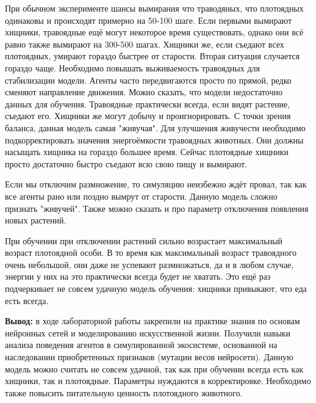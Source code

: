 \documentclass[a4paper,14pt]{extarticle}
\begin{document}
При обычном эксперименте шансы вымирания что траводяных, что плотоядных одинаковы и происходят примерно на 50-100 шаге. Если 
первыми вымирают хищники, травоядные ещё могут некоторое время существовать, однако они всё равно также вымирают на 300-500 шагах. 
Хищники же, если съедают всех плотоядных, умирают гораздо быстрее от старости. Вторая ситуация случается гораздо чаще. Необходимо 
повышать выживаемость травоядных для стабилизации модели. Агенты часто передвигаются просто по прямой, редко сменяют направление 
движения. Можно сказать, что модели недостаточно данных для обучения. Травоядные практически всегда, если видят растение, съедают его. 
Хищники же могут добычу и проигнорировать. С точки зрения баланса, данная модель самая "живучая". Для улучшения живучести необходимо подкорректировать
значения энергоёмкости травоядных животных. Они должны насыщать хищника на гораздо большее время. Сейчас плотоядные хищники просто 
достаточно быстро съедают всю свою пищу и вымирают.

Если мы отключим размножение, то симуляцию неизбежно ждёт провал, так как все агенты рано или поздно вымрут от старости. Данную 
модель сложно признать "живучей". Также можно сказать и про параметр отключения появления новых растений. 

При обучении при отключении растений сильно возрастает максимальный возраст плотоядной особи. В то время как максимальный возраст травоядного 
очень небольшой, они даже не успевают размножаться, да и в любом случае, энергии у них на это практически всегда будет не хватать.
Это ещё раз подчеркивает не совсем удачную модель обучения: хищники привыкают, что еда есть всегда. 

\textbf{Вывод: } в ходе лабораторной работы закрепили на практике знания по основам нейронных сетей и
моделированию искусственной жизни. Получили навыки анализа поведения
агентов в симулированной экосистеме, основанной на наследовании
приобретенных признаков (мутации весов нейросети). Данную модель можно считать не совсем удачной, так как 
при обучении всегда есть как хищники, так и плотоядные. Параметры нуждаются в корректировке. Необходимо также 
повысить питательную ценность плотоядного животного.
\end{document}
